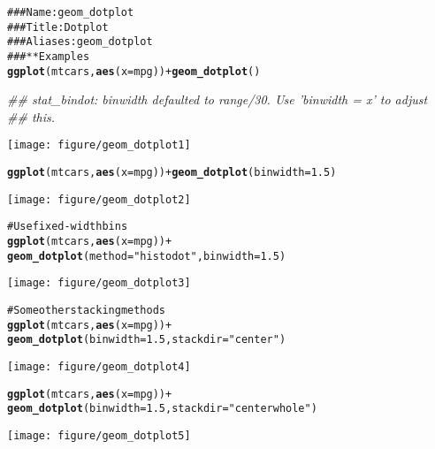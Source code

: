 \documentclass[a4paper,titlepage]{tufte-handout}\usepackage{graphicx, color}
\makeatletter
\def\maxwidth{ %
  \ifdim\Gin@nat@width>\linewidth
    \linewidth
  \else
    \Gin@nat@width
  \fi
}
\newcommand{\hlfunctioncall}[1]{\textcolor[rgb]{0.501960784313725,0,0.329411764705882}{\textbf{#1}}}%
\newcommand{\hlstring}[1]{\textcolor[rgb]{0.6,0.6,1}{#1}}%
\newcommand{\hlcomment}[1]{\textcolor[rgb]{0.180392156862745,0.6,0.341176470588235}{#1}}%
\newenvironment{kframe}{%
 \def\at@end@of@kframe{}%
 \ifinner\ifhmode%
  \def\at@end@of@kframe{\end{minipage}}%
  \begin{minipage}{\columnwidth}%
 \fi\fi%
 \def\FrameCommand##1{\hskip\@totalleftmargin \hskip-\fboxsep
 \colorbox{shadecolor}{##1}\hskip-\fboxsep
     \hskip-\linewidth \hskip-\@totalleftmargin \hskip\columnwidth}%
 \MakeFramed {\advance\hsize-\width
   \@totalleftmargin\z@ \linewidth\hsize
   \@setminipage}}%
 {\par\unskip\endMakeFramed%
 \at@end@of@kframe}
\newenvironment{knitrout}{}{} %
\makeatother
\begin{document}
\begin{knitrout}
\color{fgcolor}\begin{kframe}
\begin{alltt}
\hlcomment{### Name: geom_dotplot}
\hlcomment{### Title: Dot plot}
\hlcomment{### Aliases: geom_dotplot}
\hlcomment{### ** Examples}
\hlfunctioncall{ggplot}(mtcars, \hlfunctioncall{aes}(x = mpg)) + \hlfunctioncall{geom_dotplot}()
\end{alltt}
\begin{flushleft}\ttfamily\noindent\itshape\textcolor{messagecolor}{\#\# stat\_bindot: binwidth defaulted to range/30. Use 'binwidth = x' to adjust \\ 
\#\# this.}\end{flushleft}\end{kframe}\texttt{[image: figure/geom\_dotplot1]} \begin{kframe}\begin{alltt}
\hlfunctioncall{ggplot}(mtcars, \hlfunctioncall{aes}(x = mpg)) + \hlfunctioncall{geom_dotplot}(binwidth = 1.5)
\end{alltt}
\end{kframe}\texttt{[image: figure/geom\_dotplot2]} \begin{kframe}\begin{alltt}
\hlcomment{# Use fixed-width bins}
\hlfunctioncall{ggplot}(mtcars, \hlfunctioncall{aes}(x = mpg)) +
  \hlfunctioncall{geom_dotplot}(method=\hlstring{"histodot"}, binwidth = 1.5)
\end{alltt}
\end{kframe}\texttt{[image: figure/geom\_dotplot3]} \begin{kframe}\begin{alltt}
\hlcomment{# Some other stacking methods}
\hlfunctioncall{ggplot}(mtcars, \hlfunctioncall{aes}(x = mpg)) +
  \hlfunctioncall{geom_dotplot}(binwidth = 1.5, stackdir = \hlstring{"center"})
\end{alltt}
\end{kframe}\texttt{[image: figure/geom\_dotplot4]} \begin{kframe}\begin{alltt}
\hlfunctioncall{ggplot}(mtcars, \hlfunctioncall{aes}(x = mpg)) +
  \hlfunctioncall{geom_dotplot}(binwidth = 1.5, stackdir = \hlstring{"centerwhole"})
\end{alltt}
\end{kframe}\texttt{[image: figure/geom\_dotplot5]} \begin{kframe}\begin{alltt}

\end{alltt}
\end{kframe}
\end{knitrout}
\end{document}
